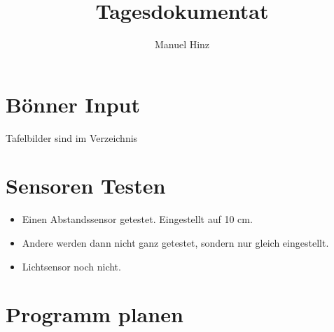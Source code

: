 \documentclass{article}
\author{Manuel Hinz}
\title{Tagesdokumentat}
\begin{document}
\maketitle

\section{B\"{o}nner Input}

Tafelbilder sind im Verzeichnis 

\section{Sensoren Testen}

\begin{itemize}

\item Einen Abstandssensor getestet. Eingestellt auf 10 cm.

\item Andere werden dann nicht ganz getestet, sondern nur gleich eingestellt. 

\item Lichtsensor noch nicht.

\end{itemize}

\section{Programm planen}
\end{document}
